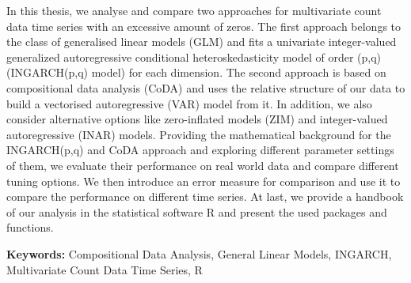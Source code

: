 In this thesis, we analyse and compare two approaches for multivariate count data time series with an excessive amount of zeros. The first approach belongs to the class of generalised linear models (GLM) and fits a univariate integer-valued generalized autoregressive conditional heteroskedasticity model of order (p,q) (INGARCH(p,q) model) for each dimension. The second approach is based on compositional data analysis (CoDA) and uses the relative structure of our data to build a vectorised autoregressive (VAR) model from it. In addition, we also consider alternative options like zero-inflated models (ZIM) and integer-valued autoregressive (INAR) models. Providing the mathematical background for the INGARCH(p,q) and CoDA approach and exploring different parameter settings of them, we evaluate their performance on real world data and compare different tuning options. We then introduce an error measure for comparison and use it to compare the performance on different time series. At last, we provide a handbook of our analysis in the statistical software R and present the used packages and functions. \newline

\textbf{Keywords:} Compositional Data Analysis, General Linear Models, INGARCH, Multivariate Count Data Time Series, R